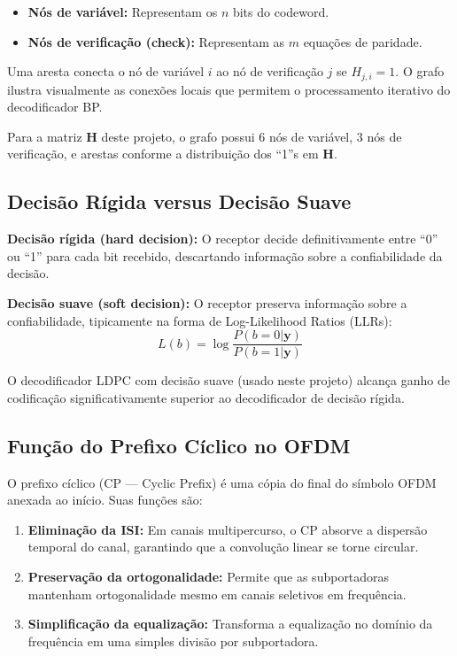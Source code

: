 \documentclass[conference]{IEEEtran}
\begin{document}
\begin{itemize}
    \item \textbf{Nós de variável:} Representam os $n$ bits do codeword.
    \item \textbf{Nós de verificação (check):} Representam as $m$ equações de paridade.
\end{itemize}

Uma aresta conecta o nó de variável $i$ ao nó de verificação $j$ se $H_{j,i} = 1$. O grafo ilustra visualmente as conexões locais que permitem o processamento iterativo do decodificador BP.

Para a matriz $\mathbf{H}$ deste projeto, o grafo possui 6 nós de variável, 3 nós de verificação, e arestas conforme a distribuição dos ``1''s em $\mathbf{H}$.

\subsection{Decisão Rígida versus Decisão Suave}

\textbf{Decisão rígida (hard decision):} O receptor decide definitivamente entre ``0'' ou ``1'' para cada bit recebido, descartando informação sobre a confiabilidade da decisão.

\textbf{Decisão suave (soft decision):} O receptor preserva informação sobre a confiabilidade, tipicamente na forma de Log-Likelihood Ratios (LLRs):
\begin{equation}
    L(b) = \log\frac{P(b=0|\mathbf{y})}{P(b=1|\mathbf{y})}
\end{equation}

O decodificador LDPC com decisão suave (usado neste projeto) alcança ganho de codificação significativamente superior ao decodificador de decisão rígida.

\subsection{Função do Prefixo Cíclico no OFDM}

O prefixo cíclico (CP --- Cyclic Prefix) é uma cópia do final do símbolo OFDM anexada ao início. Suas funções são:

\begin{enumerate}
    \item \textbf{Eliminação da ISI:} Em canais multipercurso, o CP absorve a dispersão temporal do canal, garantindo que a convolução linear se torne circular.
    \item \textbf{Preservação da ortogonalidade:} Permite que as subportadoras mantenham ortogonalidade mesmo em canais seletivos em frequência.
    \item \textbf{Simplificação da equalização:} Transforma a equalização no domínio da frequência em uma simples divisão por subportadora.
\end{enumerate}
\end{document}
